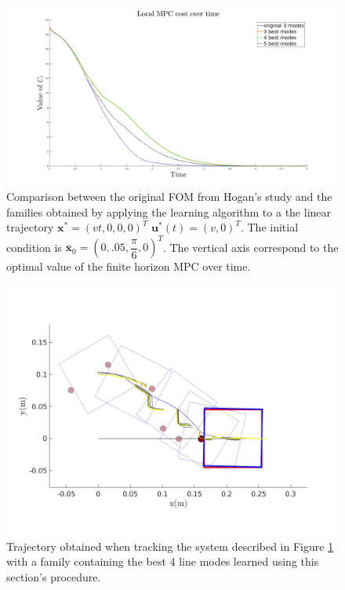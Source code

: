 \documentclass[12,twoside]{TFG-GM}
\theoremstyle{definition}
\theoremstyle{remark}
\newcommand*\diff[1]{\bar{#1}}
\begin{document}
\begin{figure}[htb!]
\begin{center}
\includegraphics[width=13cm]{line_costs_definitive.jpg}
\caption{\label{fig:line_costs_definitive} \small Comparison between the original FOM from Hogan's study and the families obtained by applying the learning algorithm to a the linear trajectory $\textbf{x}^* =(v t, 0, 0, 0)^T$ $\textbf{u}^*(t) = (v, 0)^T$. The initial condition is $\diff{\textbf{x}}_0 = (0, .05, \dfrac{\pi}{6}, 0)^T$. The vertical axis correspond to the optimal value of the finite horizon MPC over time.}
\end{center}

\end{figure}
\begin{figure}[htb!]
\begin{center}
\includegraphics[width=13cm]{line_4_modes_definitive.jpg}
\caption{\label{fig:line_4_modes_definitive} \small Trajectory obtained when tracking the system described in Figure \ref{fig:line_costs_definitive} with a family containing the best 4 line modes learned using this section's procedure.}
\end{center}
\end{figure}
\end{document}

